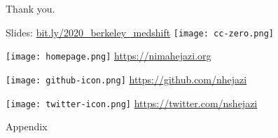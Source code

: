 \documentclass{beamer}
\begin{document}
\begin{frame}[c]{Thank you.}

\large
Slides: \href{http://bit.ly/2020\_berkeley\_medshift}{bit.ly/2020\_berkeley\_medshift}
  \quad \texttt{[image: cc-zero.png]}

\vspace{2mm}
\texttt{[image: homepage.png]} \url{https://nimahejazi.org}

\vspace{2mm}
\texttt{[image: github-icon.png]}
  \url{https://github.com/nhejazi}

\vspace{2mm}
\texttt{[image: twitter-icon.png]}
  \url{https://twitter.com/nshejazi}

\end{frame}


\appendix
\begin{frame}[standout]
  Appendix
\end{frame}
\end{document}
